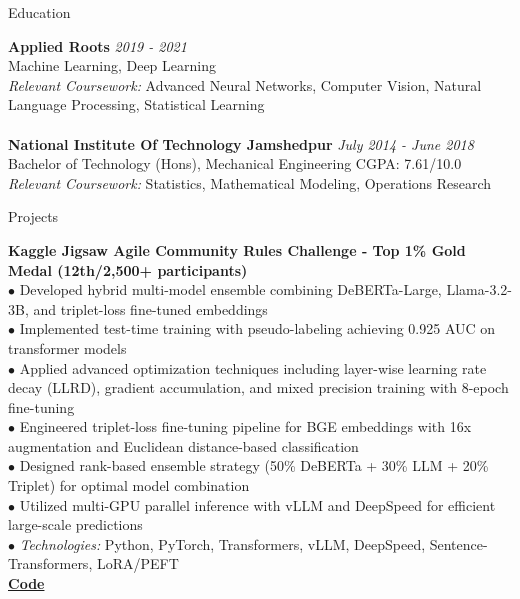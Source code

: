 \documentclass{resume} %
\begin{document}

\begin{rSection}{Education}

{\bf Applied Roots} \hfill {\em 2019 - 2021} 
\\ Machine Learning, Deep Learning 
\\ {\em Relevant Coursework:} Advanced Neural Networks, Computer Vision, Natural Language Processing, Statistical Learning
\\
\\{\bf National Institute Of Technology Jamshedpur} \hfill {\em July 2014 - June 2018} 
\\ Bachelor of Technology (Hons), Mechanical Engineering \hfill {CGPA: 7.61/10.0}
\\ {\em Relevant Coursework:} Statistics, Mathematical Modeling, Operations Research

\end{rSection}


\begin{rSection}{Projects}

{\bf Kaggle Jigsaw Agile Community Rules Challenge - Top 1\% Gold Medal (12th/2,500+ participants)}\\
$\bullet$ Developed hybrid multi-model ensemble combining DeBERTa-Large, Llama-3.2-3B, and triplet-loss fine-tuned embeddings\\
$\bullet$ Implemented test-time training with pseudo-labeling achieving 0.925 AUC on transformer models\\
$\bullet$ Applied advanced optimization techniques including layer-wise learning rate decay (LLRD), gradient accumulation, and mixed precision training with 8-epoch fine-tuning\\
$\bullet$ Engineered triplet-loss fine-tuning pipeline for BGE embeddings with 16x augmentation and Euclidean distance-based classification\\
$\bullet$ Designed rank-based ensemble strategy (50\% DeBERTa + 30\% LLM + 20\% Triplet) for optimal model combination\\
$\bullet$ Utilized multi-GPU parallel inference with vLLM and DeepSpeed for efficient large-scale predictions\\
$\bullet$ {\em Technologies:} Python, PyTorch, Transformers, vLLM, DeepSpeed, Sentence-Transformers, LoRA/PEFT\\
\href{https://github.com/level14taken}{{\bf Code}}

\end{rSection}
\end{document}
